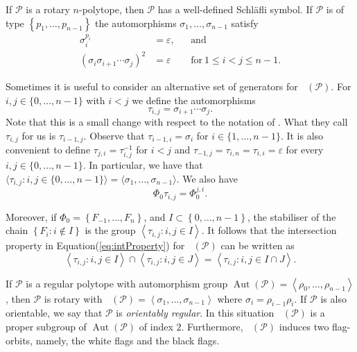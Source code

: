 \documentclass[final]{amsart}
\theoremstyle{plain}
\theoremstyle{definition}
\theoremstyle{remark}
\numberwithin{equation}{section}
\renewcommand{\leq}{\leqslant} \renewcommand{\geq}{\geqslant}
\renewcommand{\{}{\lbrace}
\renewcommand{\}}{\rbrace}
\newcommand{\cP}{\mathcal{P}}
\newcommand{\id}{\varepsilon}
\DeclareMathOperator{\aut}{Aut} \DeclareMathOperator{\autp}{\aut^{+}}
\newcommand{\baseFlag}{\Phi_{0}}
\begin{document}
If $\cP$ is a rotary $n$-polytope, then $\cP$ has a well-defined Schläfli symbol. 
If $\cP$ is of type $\left\{ p_{1}, \dots, p_{n-1} \right\} $ the automorphisms $\sigma_{1}, \dots, \sigma_{n-1}$ satisfy 
\begin{equation}\label{eq:relsSigmas}
 \begin{aligned}
		 	  \sigma_{i}^{p_{i}} &= \id, && \text{and} \\
	  (\sigma_{i} \sigma_{i+1} \cdots \sigma_{j})^{2} &= \id && \text{for}\ 1 \leq i < j \leq n-1.
 \end{aligned}
\end{equation}

Sometimes it is useful to consider an alternative set of generators for $\autp(\cP)$. 
For $i,j \in \{0, \dots, n-1\}$ with $i <j$ we define the automorphisms 
\[\tau_{i,j} = \sigma_{i+1}\cdots \sigma_{j}.\] 
Note that this is a small change with respect to the notation of \cite[Eq. 5]{SchulteWeiss_1991_ChiralPolytopes}. 
What they call $\tau_{i,j}$ for us is $\tau_{i-1,j}$. 
Observe that $\tau_{i-1,i} = \sigma_{i}$ for $i \in \{1, \dots, n-1\}$. It is also convenient to define $\tau_{j,i} = \tau_{i,j}^{-1}$ for $i < j$ and $\tau_{-1,j}= \tau_{i,n} = \tau_{i,i} = \id$ for every $i,j \in \{0, \dots, n-1\}$. 
In particular, we have that $\langle \tau_{i,j} : i,j \in \{0, \dots, n-1\} \rangle = \langle \sigma_{1}, \dots, \sigma_{n-1} \rangle$. 
We also have \[\baseFlag\tau_{i,j}= \baseFlag^{j,i}.\]

Moreover, if $\baseFlag = \left\{ F_{-1}, \dots, F_{n} \right\} $, and $I \subset \left\{ 0, \dots, n-1 \right\} $,  the stabiliser of the chain $\left\{ F_{i} : i \not\in I  \right\} $ is the group $\left\langle \tau_{i,j} : i,j \in I \right\rangle $.
It follows that the intersection property in Equation\nobreakspace \textup {(\ref {eq:intProperty})} for $\autp(\cP)$ can be written as
\begin{equation}\label{eq:intPropertyChiral}
 \left\langle \tau_{i,j} : i,j \in I \right\rangle \cap \left\langle \tau_{i,j} : i,j \in J \right\rangle = \left\langle \tau_{i,j} : i,j \in I \cap J \right\rangle.  
\end{equation}

If $\cP$ is a regular polytope with automorphism group $\aut(\cP) = \left\langle \rho_{0}, \dots, \rho_{n-1} \right\rangle $, then $\cP$ is rotary with $\autp(\cP) = \left\langle \sigma_{1}, \dots, \sigma_{n-1} \right\rangle $ where $\sigma_{i} = \rho_{i-1} \rho_{i}$. 
If $\cP$ is also orientable, we say that $\cP$ is \emph{orientably regular}.
In this situation $\autp(\cP)$ is a proper subgroup of $\aut(\cP)$ of index $2$.
Furthermore, $\autp(\cP)$ induces two flag-orbits, namely, the white flags and the black flags.
\end{document}
